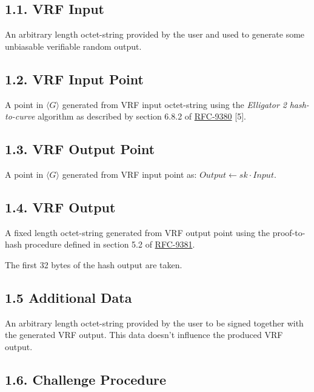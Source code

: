 \documentclass[
]{article}
\begin{document}
\hypertarget{vrf-input}{%
\subsection{1.1. VRF Input}\label{vrf-input}}

An arbitrary length octet-string provided by the user and used to
generate some unbiasable verifiable random output.

\hypertarget{vrf-input-point}{%
\subsection{1.2. VRF Input Point}\label{vrf-input-point}}

A point in \(\langle G \rangle\) generated from VRF input octet-string
using the \emph{Elligator 2} \emph{hash-to-curve} algorithm as described
by section 6.8.2 of
\href{https://datatracker.ietf.org/doc/rfc9380}{RFC-9380} {[}5{]}.

\hypertarget{vrf-output-point}{%
\subsection{1.3. VRF Output Point}\label{vrf-output-point}}

A point in \(\langle G \rangle\) generated from VRF input point as:
\(Output \gets sk \cdot Input\).

\hypertarget{vrf-output}{%
\subsection{1.4. VRF Output}\label{vrf-output}}

A fixed length octet-string generated from VRF output point using the
proof-to-hash procedure defined in section 5.2 of
\href{https://datatracker.ietf.org/doc/rfc9381}{RFC-9381}.

The first 32 bytes of the hash output are taken.

\hypertarget{additional-data}{%
\subsection{1.5 Additional Data}\label{additional-data}}

An arbitrary length octet-string provided by the user to be signed
together with the generated VRF output. This data doesn't influence the
produced VRF output.

\hypertarget{challenge-procedure}{%
\subsection{1.6. Challenge Procedure}\label{challenge-procedure}}
\end{document}
